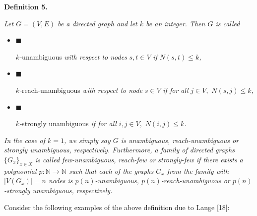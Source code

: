 \documentclass[10pt,a4paper]{article}
\begin{document}


\par\medskip\noindent\textbf{
\textbf{Definition 5}\textbf{.}
}\par



\emph{Let $G=(V,E)$ be a directed graph and let $k$ be an integer. Then $G$ is called}\par


\begin{itemize}


\item[] 
$\blacksquare$ 


$k$\emph{-}unambiguous\emph{ with respect to nodes }$s,t\in V$\emph{ if }$N(s,t)\leq k$\emph{,}\par





\item[] 
$\blacksquare$ 


$k$\emph{-}reach-unambiguous\emph{ with respect to node }$s\in V$\emph{ if for all }$j\in V,$\emph{ }$N(s,j)\leq k$\emph{,}\par





\item[] 
$\blacksquare$ 


$k$\emph{-}strongly unambiguous\emph{ if for all }$i,j\in V,$\emph{ }$N(i,j)\leq k$\emph{.}\par





\end{itemize}


\emph{In the case of $k=1$, we simply say $G$ is unambiguous, reach-unambiguous or strongly unambiguous, respectively.
Furthermore, a family of directed graphs $\{G_{x}\}_{x\in X}$ is called few-unambiguous, reach-few or strongly-few if there exists a polynomial $p:\mathbb{N}\rightarrow\mathbb{N}$ such that each of the graphs $G_{x}$ from the family with $|V(G_{x})|=n$ nodes is $p(n)$-unambiguous, $p(n)$-reach-unambiguous or $p(n)$-strongly unambiguous, respectively.}\par






Consider the following examples of the above definition due to Lange [18]:\par
\end{document}
